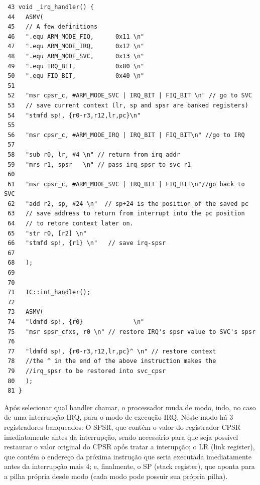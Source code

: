 \documentclass{ufscThesis/ufscThesis} %
\begin{document}
\begin{verbatim}
 43 void _irq_handler() {
 44   ASMV(
 45   // A few definitions
 46   ".equ ARM_MODE_FIQ,      0x11 \n"
 47   ".equ ARM_MODE_IRQ,      0x12 \n"
 48   ".equ ARM_MODE_SVC,      0x13 \n"
 49   ".equ IRQ_BIT,           0x80 \n"
 50   ".equ FIQ_BIT,           0x40 \n"
 51 
 52   "msr cpsr_c, #ARM_MODE_SVC | IRQ_BIT | FIQ_BIT \n" // go to SVC
 53   // save current context (lr, sp and spsr are banked registers)
 54   "stmfd sp!, {r0-r3,r12,lr,pc}\n"
 55 
 56   "msr cpsr_c, #ARM_MODE_IRQ | IRQ_BIT | FIQ_BIT\n" //go to IRQ
 57 
 58   "sub r0, lr, #4 \n" // return from irq addr
 59   "mrs r1, spsr   \n" // pass irq_spsr to svc r1
 60 
 61   "msr cpsr_c, #ARM_MODE_SVC | IRQ_BIT | FIQ_BIT\n"//go back to SVC
 62   "add r2, sp, #24 \n"  // sp+24 is the position of the saved pc
 63   // save address to return from interrupt into the pc position
 64   // to retore context later on.
 65   "str r0, [r2] \n" 
 66   "stmfd sp!, {r1} \n"   // save irq-spsr
 67       
 68   );    
 69   
 70     
 71   IC::int_handler();
 72     
 73   ASMV(        
 74   "ldmfd sp!, {r0}              \n"
 75   "msr spsr_cfxs, r0 \n" // restore IRQ's spsr value to SVC's spsr
 76             
 77   "ldmfd sp!, {r0-r3,r12,lr,pc}^ \n" // restore context
 78   //the ^ in the end of the above instruction makes the 
 79   //irq_spsr to be restored into svc_cpsr
 80   );
 81 }
\end{verbatim}

Após selecionar qual handler chamar, o processador muda de modo, indo, no caso de uma interrupção IRQ, para o modo de execução IRQ. Neste modo há 3 registradores banqueados: O SPSR, que contém o valor do registrador CPSR imediatamente antes da interrupção, sendo necessário para que seja possível restaurar o valor original do CPSR após tratar a interupção; o LR (link register), que contém o endereço da próxima instrução que seria executada imediatamente antes da interrupção mais 4; e, finalmente, o SP (stack register), que aponta para a pilha própria desde modo (cada modo pode possuir sua própria pilha).
\end{document}
